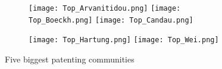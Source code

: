 
\begin{figure}
\begin{subfigure}[c]{0.5\textwidth}
\texttt{[image: Top\_Arvanitidou.png]}
\texttt{[image: Top\_Boeckh.png]}
\texttt{[image: Top\_Candau.png]}
\end{subfigure}
\begin{subfigure}[r]{0.5\textwidth}
\texttt{[image: Top\_Hartung.png]}
\texttt{[image: Top\_Wei.png]}
\end{subfigure}
\caption{Five biggest patenting communities}
\label{fig:top_communities}
\end{figure}